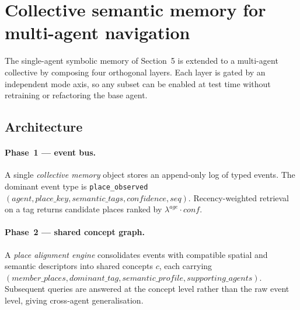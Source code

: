 %
%     
%

\section{Collective semantic memory for multi-agent navigation}
\label{sec:collective-memory}

The single-agent symbolic memory of Section~5 is extended to a
multi-agent collective by composing four orthogonal layers.  Each layer
is gated by an independent mode axis, so any subset can be enabled at
test time without retraining or refactoring the base agent.

\subsection{Architecture}
\label{sec:collective-arch}

\paragraph{Phase~1 — event bus.}
A single \emph{collective memory} object stores an append-only log of
typed events.  The dominant event type is
\texttt{place\_observed}$(agent, place\_key, semantic\_tags,
confidence, seq)$.  Recency-weighted retrieval on a tag returns
candidate places ranked by $\lambda^{age}\cdot conf$.

\paragraph{Phase~2 — shared concept graph.}
A \emph{place alignment engine} consolidates events with compatible
spatial and semantic descriptors into shared concepts $c$, each
carrying $(member\_places, dominant\_tag, semantic\_profile,
supporting\_agents)$.  Subsequent queries are answered at the concept
level rather than the raw event level, giving cross-agent generalisation.

